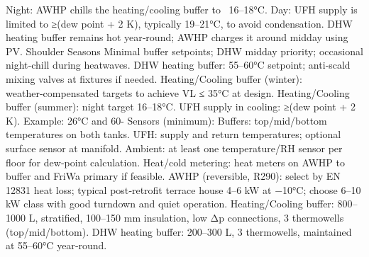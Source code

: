 \markdownRendererUlItem Night: AWHP chills the heating/cooling buffer to ~16–18°C.\markdownRendererUlItemEnd 
\markdownRendererUlItem Day: UFH supply is limited to ≥(dew point + 2 K), typically 19–21°C, to avoid condensation.\markdownRendererUlItemEnd 
\markdownRendererUlItem DHW heating buffer remains hot year‑round; AWHP charges it around midday using PV.\markdownRendererUlItemEnd 
\markdownRendererUlItem Shoulder Seasons\markdownRendererUlItemEnd 
\markdownRendererUlItem Minimal buffer setpoints; DHW midday priority; occasional night‑chill during heatwaves.\markdownRendererUlItemEnd 
\markdownRendererUlEnd \markdownRendererInterblockSeparator
{}
\markdownRendererSectionEnd \markdownRendererSectionBegin
{}\markdownRendererInterblockSeparator
{}\markdownRendererUlBeginTight
\markdownRendererUlItem DHW heating buffer: 55–60°C setpoint; anti‑scald mixing valves at fixtures if needed.\markdownRendererUlItemEnd 
\markdownRendererUlItem Heating/Cooling buffer (winter): weather‑compensated targets to achieve VL ≤ 35°C at design.\markdownRendererUlItemEnd 
\markdownRendererUlItem Heating/Cooling buffer (summer): night target 16–18°C.\markdownRendererUlItemEnd 
\markdownRendererUlItem UFH supply in cooling: ≥(dew point + 2 K). Example: 26°C and 60- Sensors (minimum):\markdownRendererUlItemEnd 
\markdownRendererUlItem Buffers: top/mid/bottom temperatures on both tanks.\markdownRendererUlItemEnd 
\markdownRendererUlItem UFH: supply and return temperatures; optional surface sensor at manifold.\markdownRendererUlItemEnd 
\markdownRendererUlItem Ambient: at least one temperature/RH sensor per floor for dew‑point calculation.\markdownRendererUlItemEnd 
\markdownRendererUlItem Heat/cold metering: heat meters on AWHP to buffer and FriWa primary if feasible.\markdownRendererUlItemEnd 
\markdownRendererUlEndTight \markdownRendererInterblockSeparator
{}
\markdownRendererSectionEnd \markdownRendererSectionBegin
{}\markdownRendererInterblockSeparator
{}\markdownRendererUlBeginTight
\markdownRendererUlItem AWHP (reversible, R290): select by EN 12831 heat loss; typical post‑retrofit terrace house 4–6 kW at −10°C; choose 6–10 kW class with good turndown and quiet operation.\markdownRendererUlItemEnd 
\markdownRendererUlItem Heating/Cooling buffer: 800–1000 L, stratified, 100–150 mm insulation, low Δp connections, 3 thermowells (top/mid/bottom).\markdownRendererUlItemEnd 
\markdownRendererUlItem DHW heating buffer: 200–300 L, 3 thermowells, maintained at 55–60°C year‑round.\markdownRendererUlItemEnd 
